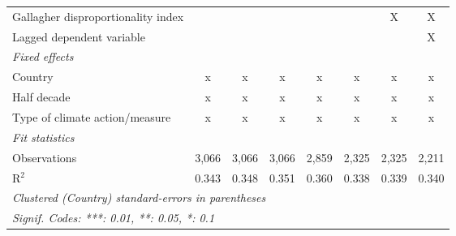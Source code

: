 \begin{tabular}{lccccccc}
   Gallagher disproportionality index                                                 &         &         &         &         &               & X            & X\\  
   Lagged dependent variable                                                          &         &         &         &         &               &              & X\\  
   \emph{Fixed effects}\\
   Country                                                                            & x       & x       & x       & x       & x             & x            & x\\  
   Half decade                                                                        & x       & x       & x       & x       & x             & x            & x\\  
   Type of climate action/measure                                                     & x       & x       & x       & x       & x             & x            & x\\  
   \midrule \emph{Fit statistics}\\
   Observations                                                                       & 3,066   & 3,066   & 3,066   & 2,859   & 2,325         & 2,325        & 2,211\\  
   R$^2$                                                                              & 0.343   & 0.348   & 0.351   & 0.360   & 0.338         & 0.339        & 0.340\\  
   \midrule
   \multicolumn{8}{l}{\emph{Clustered (Country) standard-errors in parentheses}}\\
   \multicolumn{8}{l}{\emph{Signif. Codes: ***: 0.01, **: 0.05, *: 0.1}}\\
\end{tabular}
\par\endgroup


